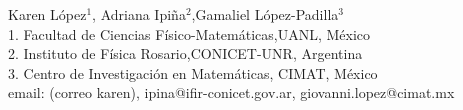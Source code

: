 \changefontsizes{14pt}
\begin{center}
    \begin{minipage}{0.8\linewidth}
        \centering
        \vspace*{0.7cm}
        \changefontsizes{14pt}

        \changefontsizes{12pt}
        Karen López$^1$, Adriana Ipiña$^{2}$,Gamaliel López-Padilla$^{3}$\\
        1. Facultad de Ciencias Físico-Matemáticas,UANL, México\\
        2. Instituto de Física Rosario,CONICET-UNR, Argentina\\
        3. Centro de Investigación en Matemáticas, CIMAT, México\\
        email: (correo karen), ipina@ifir-conicet.gov.ar, giovanni.lopez@cimat.mx
    \end{minipage}
\end{center}